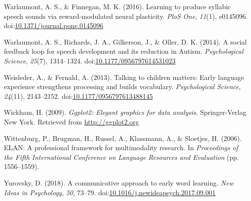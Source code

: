 \documentclass[floatsintext,man]{apa6}
\theoremstyle{definition}
\theoremstyle{definition}
\theoremstyle{definition}
\theoremstyle{remark}
\begin{document}
\hypertarget{ref-warlaumont2016learning}{}
Warlaumont, A. S., \& Finnegan, M. K. (2016). Learning to produce
syllabic speech sounds via reward-modulated neural plasticity.
\emph{PloS One}, \emph{11}(1), e0145096.
doi:\href{https://doi.org/10.1371/journal.pone.0145096}{10.1371/journal.pone.0145096}

\hypertarget{ref-warlaumont2014social}{}
Warlaumont, A. S., Richards, J. A., Gilkerson, J., \& Oller, D. K.
(2014). A social feedback loop for speech development and its reduction
in Autism. \emph{Psychological Science}, \emph{25}(7), 1314--1324.
doi:\href{https://doi.org/10.1177/0956797614531023}{10.1177/0956797614531023}

\hypertarget{ref-weisleder2013talking}{}
Weisleder, A., \& Fernald, A. (2013). Talking to children matters: Early
language experience strengthens processing and builds vocabulary.
\emph{Psychological Science}, \emph{24}(11), 2143--2152.
doi:\href{https://doi.org/10.1177/0956797613488145}{10.1177/0956797613488145}

\hypertarget{ref-R-ggplot2}{}
Wickham, H. (2009). \emph{Ggplot2: Elegant graphics for data analysis}.
Springer-Verlag New York. Retrieved from \url{http://ggplot2.org}

\hypertarget{ref-ELAN}{}
Wittenburg, P., Brugman, H., Russel, A., Klassmann, A., \& Sloetjes, H.
(2006). ELAN: A professional framework for multimodality research. In
\emph{Proceedings of the Fifth International Conference on Language
Resources and Evaluation} (pp. 1556--1559).

\hypertarget{ref-yurovsky2018communicative}{}
Yurovsky, D. (2018). A communicative approach to early word learning.
\emph{New Ideas in Psychology}, \emph{50}, 73--79.
doi:\href{https://doi.org/10.1016/j.newideapsych.2017.09.001}{10.1016/j.newideapsych.2017.09.001}

\endgroup
\end{document}
